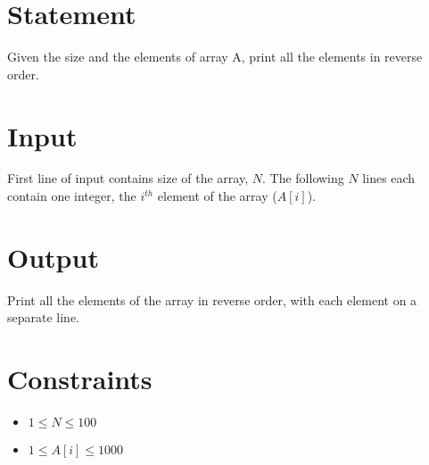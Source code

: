 \documentclass{article}
\begin{document}
\section*{Statement}

Given the size and the elements of array A, print all the elements in reverse order.

\section*{Input}

First line of input contains size of the array, $N$. The following $N$ lines each contain one integer, the $i^{th}$ element of the array ($A[i]$).

\section*{Output}

Print all the elements of the array in reverse order, with each element on a separate line.

\section*{Constraints}

\begin{itemize}
    \item $1 \le N \le 100$
    \item $1 \le A[i] \le 1000$
\end{itemize}
\end{document}
